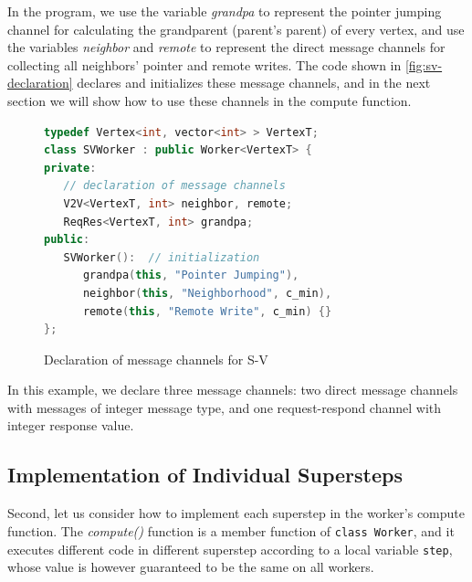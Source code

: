\documentclass{sokendai_thesis} %
\begin{document}
In the program, we use the variable \textit{grandpa} to represent the pointer jumping channel for calculating the grandparent (parent's parent) of every vertex, and use the variables \textit{neighbor} and \textit{remote} to represent the direct message channels for collecting all neighbors' pointer and remote writes.
The code shown in \autoref{fig:sv-declaration} declares and initializes these message channels, and in the next section we will show how to use these channels in the compute function.

\begin{figure}[ht]
\centering
\vspace{-2ex}
\begin{lstlisting}[basicstyle=\small,numbers=none,xleftmargin=0em,language=c++]
typedef Vertex<int, vector<int> > VertexT;
class SVWorker : public Worker<VertexT> {
private:
   // declaration of message channels
   V2V<VertexT, int> neighbor, remote;
   ReqRes<VertexT, int> grandpa;
public:
   SVWorker():  // initialization
      grandpa(this, "Pointer Jumping"),
      neighbor(this, "Neighborhood", c_min),
      remote(this, "Remote Write", c_min) {}
};
\end{lstlisting}
\vspace{-2ex}
\caption{Declaration of message channels for S-V}
\label{fig:sv-declaration}
\end{figure}

In this example, we declare three message channels:
two direct message channels with messages of integer message type, and one request-respond channel with integer response value.

\subsection{Implementation of Individual Supersteps}

Second, let us consider how to implement each superstep in the worker's compute function.
The \emph{compute()} function is a member function of \texttt{class Worker}, and it executes different code in different superstep according to a local variable \texttt{step}, whose value is however guaranteed to be the same on all workers.
\end{document}
